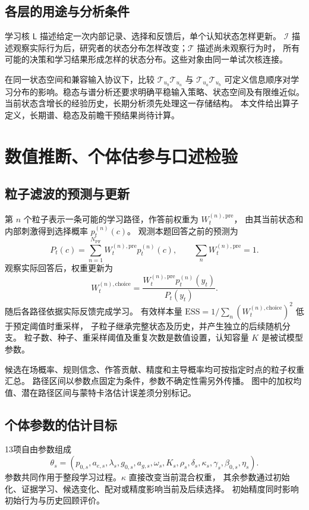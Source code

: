 \documentclass[11pt,a4paper]{article}
\numberwithin{equation}{section}
\newcommand{\Ll}{\mathsf{L}}
\newcommand{\Ii}{\mathcal{I}}
\newcommand{\Tt}{\mathcal{T}}
\begin{document}
\subsection{各层的用途与分析条件}
学习核 $\Ll$ 描述给定一次内部记录、选择和反馈后，单个认知状态怎样更新。
$\Ii$ 描述观察实际行为后，研究者的状态分布怎样改变；$\Tt$ 描述尚未观察行为时，
所有可能的决策和学习结果形成怎样的状态分布。这些对象由同一单试次核连接。

在同一状态空间和兼容输入协议下，比较 $\Tt_{u_b}\Tt_{u_a}$ 与 $\Tt_{u_a}\Tt_{u_b}$
可定义信息顺序对学习分布的影响。稳态与谱分析还要求明确平稳输入策略、状态空间及有限维近似。
当前状态含增长的经验历史，长期分析须先处理这一存储结构。
本文件给出算子定义，长期谱、稳态及前瞻干预结果尚待计算。

\section{数值推断、个体估参与口述检验}
\label{sec:inference}

\subsection{粒子滤波的预测与更新}
第 $n$ 个粒子表示一条可能的学习路径，作答前权重为 $W_t^{(n),\mathrm{pre}}$，
由其当前状态和内部刺激得到选择概率 $p_t^{(n)}(c)$。
观测本题回答之前的预测为
\begin{equation}
P_t(c)=\sum_{n=1}^{N_{\mathrm{PF}}}W_t^{(n),\mathrm{pre}}p_t^{(n)}(c),\qquad
\sum_nW_t^{(n),\mathrm{pre}}=1.
\label{eq:pf-predict}
\end{equation}
观察实际回答后，权重更新为
\begin{equation}
W_t^{(n),\mathrm{choice}}=
\frac{W_t^{(n),\mathrm{pre}}p_t^{(n)}(y_t)}{P_t(y_t)}.
\label{eq:pf-weight}
\end{equation}
随后各路径依据实际反馈完成学习。
有效样本量 $\mathrm{ESS}=1/\sum_n(W_t^{(n),\mathrm{choice}})^2$ 低于预定阈值时重采样，
子粒子继承完整状态及历史，并产生独立的后续随机分支。
粒子数、种子、重采样阈值及重复次数是数值设置，认知容量 $K$ 是被试模型参数。

候选在场概率、规则信念、作答贡献、精度和主导概率均可按指定时点的粒子权重汇总。
路径区间以参数点固定为条件，参数不确定性需另外传播。
图中的加权均值、潜在路径区间与蒙特卡洛估计误差须分别标记。

\subsection{个体参数的估计目标}
13项自由参数组成
\begin{equation}
\theta_s=(p_{0,s},a_{e,s},\lambda_s,g_{0,s},a_{g,s},\omega_s,
K_s,\rho_s,\delta_s,\kappa_s,\gamma_s,\beta_{0,s},\eta_s).
\label{eq:parameters}
\end{equation}
参数共同作用于整段学习过程。$\kappa$ 直接改变当前混合权重，
其余参数通过初始化、证据学习、候选变化、配对或精度影响当前及后续选择。
初始精度同时影响初始行为与历史回顾评价。
\end{document}
